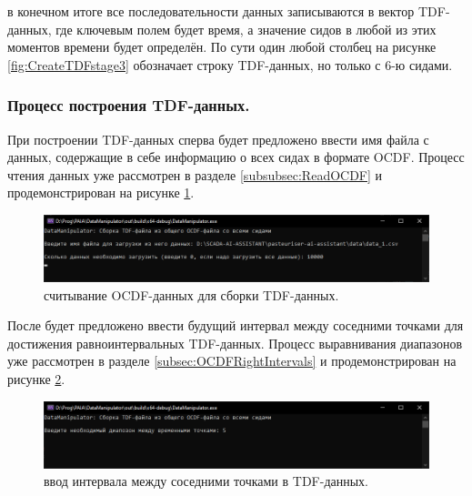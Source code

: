 {  \par в конечном итоге все последовательности данных записываются в вектор TDF-данных, где ключевым полем будет время, а значение сидов в любой из этих моментов времени будет определён. По сути один любой столбец на рисунке \ref{fig:CreateTDFstage3} обозначает строку TDF-данных, но только с 6-ю сидами.

}

\subsubsection{ \standartTitleFont
  Процесс построения TDF-данных.
} \label{subsubsec:CreateTDFProc}

{\standartFont

  \par При построении TDF-данных сперва будет предложено ввести имя файла с данных, содержащие в себе информацию о всех сидах в формате OCDF. Процесс чтения данных уже рассмотрен в разделе \ref{subsubsec:ReadOCDF} и продемонстрирован на рисунке \ref{fig:CreateTDFReadData}.

  \begin{figure}[H]
    \centering
    \includegraphics[width=\textwidth]{images/forDataManipulator/CreateTDFReadData.png}
    \caption{считывание OCDF-данных для сборки TDF-данных.}
    \label{fig:CreateTDFReadData}
  \end{figure}

  \par После будет предложено ввести будущий интервал между соседними точками для достижения равноинтервальных TDF-данных. Процесс выравнивания диапазонов уже рассмотрен в разделе \ref{subsec:OCDFRightIntervals} и продемонстрирован на рисунке \ref{fig:CreateTDFRI}.

  \begin{figure}[H]
    \centering
    \includegraphics[width=\textwidth]{images/forDataManipulator/CreateTDFRI.png}
    \caption{ввод интервала между соседними точками в TDF-данных.}
    \label{fig:CreateTDFRI}
  \end{figure}

}
